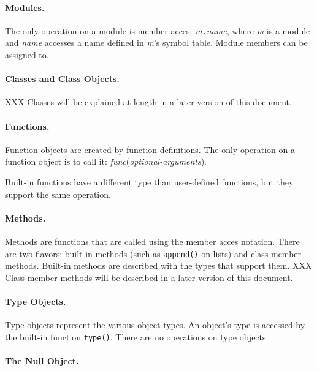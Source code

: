 \paragraph{Modules.}

The only operation on a module is member acces: {\em m}{\tt .}{\em name},
where {\em m} is a module and {\em name} accesses a name defined in
{\em m}'s symbol table.
Module members can be assigned to.

\paragraph{Classes and Class Objects.}

XXX Classes will be explained at length in a later version of this
document.

\paragraph{Functions.}

Function objects are created by function definitions.
The only operation on a function object is to call it:
{\em func}({\em optional-arguments}).

Built-in functions have a different type than user-defined functions,
but they support the same operation.

\paragraph{Methods.}

Methods are functions that are called using the member acces notation.
There are two flavors: built-in methods (such as {\tt append()} on
lists) and class member methods.
Built-in methods are described with the types that support them.
XXX Class member methods will be described in a later version of this
document.

\paragraph{Type Objects.}

Type objects represent the various object types.
An object's type is accessed by the built-in function
{\tt type()}.
There are no operations on type objects.

\paragraph{The Null Object.}

